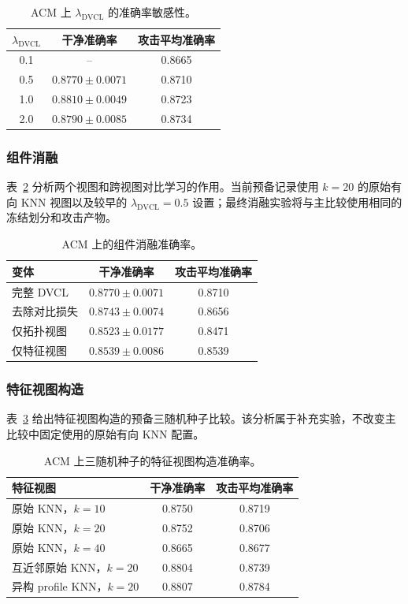\begin{table}[htbp]
\centering
\caption{ACM 上 $\lambda_{\mathrm{DVCL}}$ 的准确率敏感性。}
\label{tab:param_zh}
\begin{tabular}{ccc}
\toprule
$\lambda_{\mathrm{DVCL}}$ & 干净准确率 & 攻击平均准确率 \\
\midrule
0.1 & -- & 0.8665 \\
0.5 & $0.8770\pm0.0071$ & 0.8710 \\
1.0 & $0.8810\pm0.0049$ & 0.8723 \\
2.0 & $0.8790\pm0.0085$ & 0.8734 \\
\bottomrule
\end{tabular}
\end{table}

\subsubsection{组件消融}

表~\ref{tab:component_ablation_zh} 分析两个视图和跨视图对比学习的作用。当前预备记录使用 $k=20$ 的原始有向 KNN 视图以及较早的 $\lambda_{\mathrm{DVCL}}=0.5$ 设置；最终消融实验将与主比较使用相同的冻结划分和攻击产物。

\begin{table}[htbp]
\centering
\caption{ACM 上的组件消融准确率。}
\label{tab:component_ablation_zh}
\begin{tabular}{lcc}
\toprule
变体 & 干净准确率 & 攻击平均准确率 \\
\midrule
完整 DVCL & $0.8770\pm0.0071$ & 0.8710 \\
去除对比损失 & $0.8743\pm0.0074$ & 0.8656 \\
仅拓扑视图 & $0.8523\pm0.0177$ & 0.8471 \\
仅特征视图 & $0.8539\pm0.0086$ & 0.8539 \\
\bottomrule
\end{tabular}
\end{table}

\subsubsection{特征视图构造}

表~\ref{tab:knn_supp_zh} 给出特征视图构造的预备三随机种子比较。该分析属于补充实验，不改变主比较中固定使用的原始有向 KNN 配置。

\begin{table}[htbp]
\centering
\caption{ACM 上三随机种子的特征视图构造准确率。}
\label{tab:knn_supp_zh}
\begin{tabular}{lcc}
\toprule
特征视图 & 干净准确率 & 攻击平均准确率 \\
\midrule
原始 KNN，$k=10$ & 0.8750 & 0.8719 \\
原始 KNN，$k=20$ & 0.8752 & 0.8706 \\
原始 KNN，$k=40$ & 0.8665 & 0.8677 \\
互近邻原始 KNN，$k=20$ & 0.8804 & 0.8739 \\
异构 profile KNN，$k=20$ & 0.8807 & 0.8784 \\
\bottomrule
\end{tabular}
\end{table}

